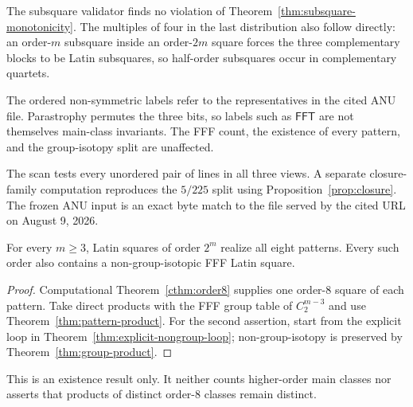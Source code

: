 The subsquare validator finds no violation of
Theorem~\ref{thm:subsquare-monotonicity}.  The multiples of four in the last
distribution also follow directly: an order-$m$ subsquare inside an
order-$2m$ square forces the three complementary blocks to be Latin
subsquares, so half-order subsquares occur in complementary quartets.

The ordered non-symmetric labels refer to the representatives in the cited
ANU file.  Parastrophy permutes the three bits, so labels such as
$\mathsf{FFT}$ are not themselves main-class invariants.  The FFF count, the
existence of every pattern, and the group-isotopy split are unaffected.

The scan tests every unordered pair of lines in all three views.  A separate
closure-family computation reproduces the $5/225$ split using
Proposition~\ref{prop:closure}.  The frozen ANU input is an exact byte match to
the file served by the cited URL on August 9, 2026.

\begin{corollary}\label{cor:all-patterns}
For every $m\geq3$, Latin squares of order $2^m$ realize all eight patterns.
Every such order also contains a non-group-isotopic FFF Latin square.
\end{corollary}

\begin{proof}
Computational Theorem~\ref{cthm:order8} supplies one order-$8$ square of each
pattern.  Take direct products with the FFF group table of $C_2^{m-3}$ and use
Theorem~\ref{thm:pattern-product}.  For the second assertion, start from the
explicit loop in Theorem~\ref{thm:explicit-nongroup-loop}; non-group-isotopy
is preserved by Theorem~\ref{thm:group-product}.
\end{proof}

This is an existence result only.  It neither counts higher-order main
classes nor asserts that products of distinct order-$8$ classes remain
distinct.
